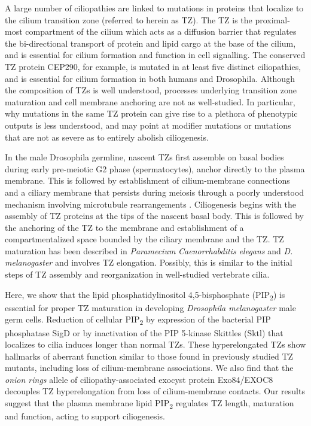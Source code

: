 \documentclass[12pt, twoside, letterpaper]{article}
\newcommand{\PIP}{PIP\textsubscript{2}}
\begin{document}
A large number of ciliopathies are linked to mutations in proteins that
localize to the cilium transition zone (referred to herein as TZ).
The TZ is the proximal-most compartment of the cilium which
acts as a diffusion barrier that regulates the
bi-directional transport of protein and lipid cargo at the base of the cilium,
and is essential for cilium formation and function in cell signalling.
The conserved TZ protein CEP290, for example, is mutated in at least
five distinct ciliopathies, and is essential for cilium formation in both humans
and Drosophila.
Although the composition of TZs is well understood, processes underlying
transition zone maturation and cell membrane anchoring are not as well-studied.
In particular, why mutations in the same TZ protein can give rise to a plethora
of phenotypic outputs is less understood, and may point at modifier mutations
or mutations that are not as severe as to entirely abolish ciliogenesis.

In the male Drosophila germline, nascent TZs first assemble on basal bodies
during early pre-meiotic G2 phase (spermatocytes), anchor directly to the plasma membrane.
This is followed by establishment of cilium-membrane connections and a
ciliary membrane that persists during meiosis \citep{riparbelli2012assembly}
through a poorly understood mechanism
involving microtubule rearrangements \citep{gottardo2013cilium}.
Ciliogenesis begins with the assembly of TZ proteins at the tips of
the nascent basal body.
This is followed by the anchoring of the TZ to the membrane and
establishment of a compartmentalized space bounded by the ciliary membrane
and the TZ.
TZ maturation has been described in
\textit{Paramecium} \citep{aubusson2015transition}
\textit{Caenorrhabditis elegans} \citep{serwas2017centrioles} and
\textit{D. melanogaster} \citep{gottardo2013cilium}
and involves TZ elongation.
Possibly, this is similar to the initial steps of TZ assembly and reorganization
in well-studied vertebrate cilia.

Here, we show that the lipid phosphatidylinositol 4,5-bisphosphate (\PIP{})
is essential for proper TZ maturation in developing \textit{Drosophila melanogaster}
male germ cells.
Reduction of cellular \PIP{} by expression of the bacterial PIP phosphatase SigD
or by inactivation of the PIP 5-kinase Skittles (Sktl) that localizes to cilia
induces longer than normal TZs.
These hyperelongated TZs show hallmarks of aberrant function similar to those
found in previously studied TZ mutants, including loss of cilium-membrane associations.
We also find that the \textit{onion rings} allele of
ciliopathy-associated exocyst protein Exo84/EXOC8 decouples TZ hyperelongation
from loss of cilium-membrane contacts.
Our results suggest that the plasma membrane lipid \PIP{} regulates TZ length,
maturation and function, acting to support ciliogenesis.
\end{document}
